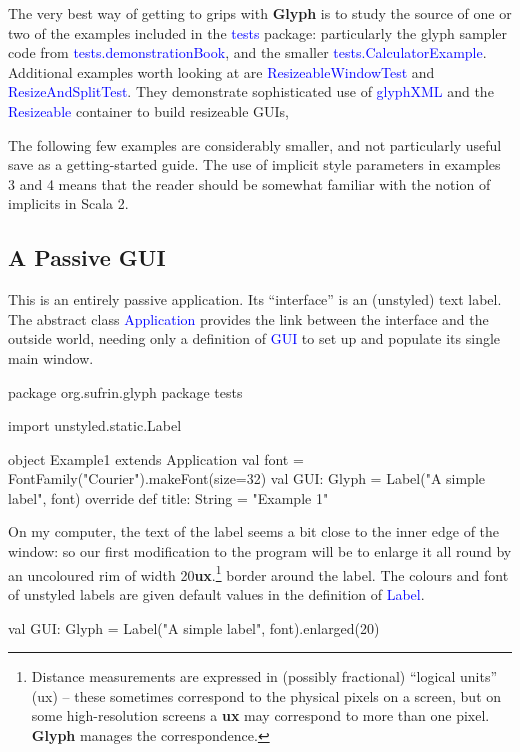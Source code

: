 \documentclass[12pt,a4paper]{article}
\def\ux{\textbf{ux}\xspace}
\def\Scala#1{\textcolor{blue}{\textsf{#1}}}
\def\SS#1{\subsection{#1}}
\begin{document}
The very best way of getting to grips with \textbf{Glyph} is to
study the source of one or two of the examples included in the
\Scala{tests} package: particularly the glyph sampler code from
\Scala{tests.demonstrationBook}, and the smaller
\Scala{tests.CalculatorExample}.  Additional examples worth looking
at are \Scala{ResizeableWindowTest} and \Scala{ResizeAndSplitTest}.
They demonstrate sophisticated use of \Scala{glyphXML} 
and the \Scala{Resizeable} container to build resizeable GUIs,

The following few examples are considerably smaller, and not
particularly useful save as a getting-started guide.  The use of
implicit style parameters in examples 3 and 4 means that the reader
should be somewhat familiar with the notion of implicits in Scala
2.


\SS{A Passive GUI}

This is an entirely passive application.
Its ``interface'' is an (unstyled) text label.
The abstract class \Scala{Application} provides the link between
the interface and the outside world, needing only a definition of
\Scala{GUI} to set up and populate its single main window.

\begin{scala}
package org.sufrin.glyph
package tests

import unstyled.static.Label

object Example1 extends Application  {
  val font = FontFamily("Courier").makeFont(size=32)
  val GUI: Glyph = Label("A simple label", font)
  override def title: String = "Example 1"
}
\end{scala}

On my computer, the text of the label seems a bit close to the
inner edge of the window: so our first modification to the
program will be to enlarge it all round by an uncoloured
rim of width 20\ux.\footnote{Distance measurements are
expressed in (possibly fractional) ``logical units'' (ux) -- these sometimes correspond
to the physical pixels on a screen, but on some high-resolution
screens a \textbf{ux} may correspond to more than one
pixel. \textbf{Glyph} manages the correspondence.} border around the label.
The colours and font of unstyled labels are given default values in
the definition of \Scala{Label}.

\begin{scala}

val GUI: Glyph = Label("A simple label", font).enlarged(20)
\end{scala}
\end{document}
